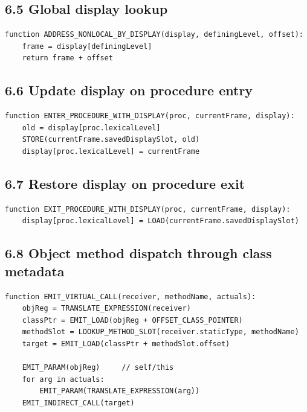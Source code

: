 \documentclass[10pt,letterpaper]{article}
\begin{document}
\subsection*{6.5 Global display lookup}

\begin{verbatim}
function ADDRESS_NONLOCAL_BY_DISPLAY(display, definingLevel, offset):
    frame = display[definingLevel]
    return frame + offset
\end{verbatim}

\subsection*{6.6 Update display on procedure entry}

\begin{verbatim}
function ENTER_PROCEDURE_WITH_DISPLAY(proc, currentFrame, display):
    old = display[proc.lexicalLevel]
    STORE(currentFrame.savedDisplaySlot, old)
    display[proc.lexicalLevel] = currentFrame
\end{verbatim}

\subsection*{6.7 Restore display on procedure exit}

\begin{verbatim}
function EXIT_PROCEDURE_WITH_DISPLAY(proc, currentFrame, display):
    display[proc.lexicalLevel] = LOAD(currentFrame.savedDisplaySlot)
\end{verbatim}

\subsection*{6.8 Object method dispatch through class metadata}

\begin{verbatim}
function EMIT_VIRTUAL_CALL(receiver, methodName, actuals):
    objReg = TRANSLATE_EXPRESSION(receiver)
    classPtr = EMIT_LOAD(objReg + OFFSET_CLASS_POINTER)
    methodSlot = LOOKUP_METHOD_SLOT(receiver.staticType, methodName)
    target = EMIT_LOAD(classPtr + methodSlot.offset)

    EMIT_PARAM(objReg)     // self/this
    for arg in actuals:
        EMIT_PARAM(TRANSLATE_EXPRESSION(arg))
    EMIT_INDIRECT_CALL(target)
\end{verbatim}
\end{document}
